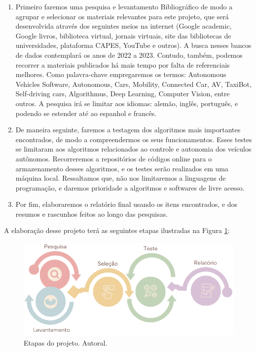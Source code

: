 \documentclass{article}
\begin{document}
\begin{enumerate}
\item Primeiro faremos uma pesquisa e levantamento Bibliográfico de modo a agrupar e selecionar os materiais relevantes para este projeto, que será desenvolvida através dos seguintes meios na internet (Google academic, Google livros, biblioteca virtual, jornais virtuais, site das bibliotecas de universidades, plataforma CAPES, YouTube e outros). A busca nesses bancos de dados contemplará os anos de 2022 a 2023. Contudo, também, podemos recorrer a materiais publicados há mais tempo por falta de referenciais melhores. Como palavra-chave empregaremos os termos: Autonomous Vehicles Software, Autonomous, Cars, Mobility, Connected Car, AV, TaxiBot, Self-driving cars, Algorithmus, Deep Learning, Computer Vision, entre outros.  A pesquisa irá se limitar aos idiomas: alemão, inglês, português, e podendo se estender até ao espanhol e francês.

\item De maneira seguinte, faremos a testagem dos algoritmos mais importantes encontrados, de modo a compreendermos os seus funcionamentos. Esses testes se limitaram aos algoritmos relacionados ao controle e autonomia dos veículos autônomos. Recorreremos a repositórios de códigos online para o armazenamento desses algoritmos, e os testes serão realizados em uma máquina local. Ressaltamos que, não nos limitaremos a linguagens de programação, e daremos prioridade a algoritmos e softwares de livre acesso.
\item Por fim, elaboraremos o relatório final usando os itens encontrados, e dos resumos e rascunhos feitos ao longo das pesquisas.
\end{enumerate}

A elaboração desse projeto terá as seguintes etapas ilustradas na Figura \ref{img_bibli}:

\begin{figure}[H]
\centering
\includegraphics[width=14cm]{Figures/methodology.png}
\caption{Etapas do projeto. Autoral.}
\label{img_bibli}
\end{figure}
\end{document}
